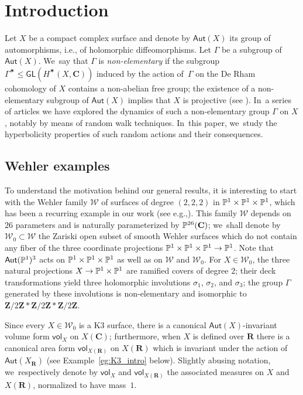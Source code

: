 \documentclass[11pt]{article}
\newcommand{\ie}{i.e.,\xspace}
\newcommand{\eg}{e.g.,\xspace}
\def\C{\mathbf{C}}
\def\R{\mathbf{R}}
\def\Z{\mathbf{Z}}
\newcommand{\cW}{\mathcal{W}}
\newcommand\Aut{\mathsf{Aut}}
\newcommand\GL{{\mathsf{GL}}}
\newcommand{\vol}{{\mathsf{vol}}}
\theoremstyle{plain}
\theoremstyle{definition}
\numberwithin{equation}{section}
\begin{document}
\section{Introduction}\label{sec:intro}

Let $X$ be a compact complex
surface and denote by $\Aut(X)$ its group of
automorphisms, \ie of holomorphic diffeomorphisms. Let $\Gamma$ be a subgroup of $\Aut(X)$. We~say that $\Gamma$ is \emph{non-elementary} if the subgroup
$\Gamma^\varstar\leq \GL(H^\varstar (X, \C))$ induced by the action of~$\Gamma$ on the De Rham cohomology of $X$ contains a non-abelian free group; the existence of
a non-elementary subgroup of $\Aut(X)$
implies that $X$ is projective (see \cite{Simons}). In~a series of articles \cite{stiffness, finite_orbits, invariant} we have
explored the dynamics of such a non-elementary group $\Gamma$ on $X$, notably by
means of random walk techniques. In~this paper, we~study the hyperbolicity properties of such random actions and their consequences.

\subsection{Wehler examples} \label{subs:wehler}
To understand the motivation behind our general results,
it is interesting to start with the Wehler family $ \cW$ of
surfaces of degree $(2,2,2)$ in $\P^1\times \P^1\times \P^1$, which has been a
recurring example in our work (see \eg \cite[\S 3]{stiffness}).
This family $ \cW$ depends on $26$ parameters and is naturally parameterized by
$\P^{26}(\C)$; we~shall denote by $ \cW_0\subset \cW$ the
Zariski open subset of smooth Wehler surfaces which do not contain any fiber of the three coordinate projections $\P^1\times \P^1\times \P^1\to \P^1$. Note that $\Aut(\P^1)^3$ acts on $\P^1\times\P^1\times \P^1$ as well as on $\cW$ and $\cW_0$.
For $X\in \cW_0$, the three natural projections $X\to \P^1\times \P^1$ are ramified covers of degree $2$; their deck transformations yield three holomorphic
involutions $\sigma_1$, $\sigma_2$, and $\sigma_3$;
the group $\Gamma$ generated by these involutions is non-elementary and isomorphic to
$\Z/2\Z\ast\Z/2\Z\ast\Z/2\Z$.

Since every $X\in \cW_0$ is a K3 surface,
there is a canonical $\Aut(X)$-invariant volume form $\vol_X$ on $X(\C)$; furthermore,
when $X$ is defined over $\R$ there is a canonical area form $\vol_{X(\R)}$
on $X(\R)$ which is invariant under the action of $\Aut(X_\R)$ (see Example~\ref{eg:K3_intro} below).
Slightly abusing notation, we~respectively denote by $\vol_X$ and $\vol_{X(\R)}$
the associated measures on $X$ and $X(\R)$, normalized to
have mass~$1$.
\end{document}
